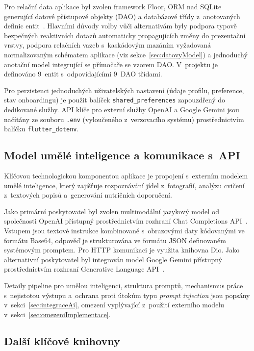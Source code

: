 Pro relační data aplikace byl zvolen framework Floor, ORM nad SQLite generující datové přístupové objekty (DAO) a databázové třídy z~anotovaných definic entit~\cite{floorDoc}.
Hlavními důvody volby vůči alternativám byly podpora typově bezpečných reaktivních dotazů automaticky propagujících změny do prezentační vrstvy, podpora relačních vazeb s~kaskádovým mazáním vyžadovaná normalizovaným schématem aplikace (viz sekce~\ref{sec:datovyModel}) a jednoduchý anotační model integrující se přímočaře se vzorem DAO.
V~projektu je definováno 9~entit s~odpovídajícími 9~DAO třídami.

Pro perzistenci jednoduchých uživatelských nastavení (údaje profilu, preference, stav onboardingu) je použit balíček \texttt{shared\_preferences} zapouzdřený do dedikované služby.
API klíče pro externí služby OpenAI a Google Gemini jsou načítány ze souboru \texttt{.env} (vyloučeného z~verzovacího systému) prostřednictvím balíčku \texttt{flutter\_dotenv}.

\subsection{Model umělé inteligence a komunikace s~API}
\label{subsec:aiApi}

Klíčovou technologickou komponentou aplikace je propojení s~externím modelem umělé inteligence, který zajišťuje rozpoznávání jídel z~fotografií, analýzu cvičení z~textových popisů a~generování nutričních doporučení.

Jako primární poskytovatel byl zvolen multimodální jazykový model od společnosti OpenAI přístupný prostřednictvím rozhraní Chat Completions API~\cite{openAiApi}.
Vstupem jsou textové instrukce kombinované s~obrazovými daty kódovanými ve formátu Base64, odpověď je strukturována ve formátu JSON definovaném systémovým promptem.
Pro HTTP komunikaci je využita knihovna Dio.
Jako alternativní poskytovatel byl integrován model Google Gemini přístupný prostřednictvím rozhraní Generative Language API~\cite{geminiApi}.

Detaily pipeline pro umělou inteligenci, struktura promptů, mechanismus práce s~nejistotou výstupu a~ochrana proti útokům typu \emph{prompt injection} jsou popsány v~sekci~\ref{sec:integraceAi}, omezení vyplývající z~použití externího modelu v~sekci~\ref{sec:omezeniImplementace}.

\subsection{Další klíčové knihovny}
\label{subsec:dalsiKnihovny}

